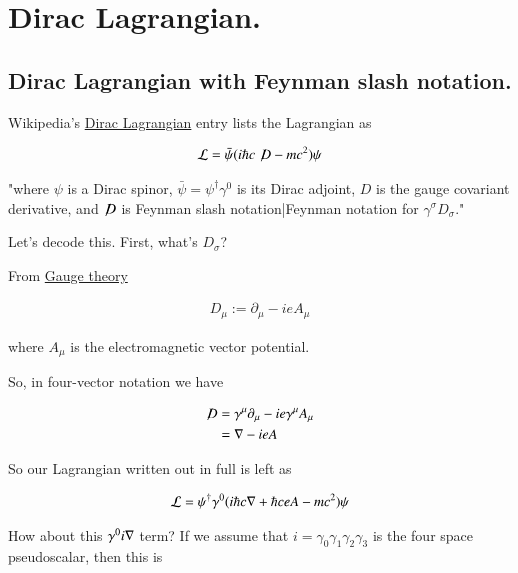 \chapter{Dirac Lagrangian.}
\label{chap:diracLagrangian}
\date{ Dec 21, 2008.  $RCSfile: diracLagrangian.tex,v $ Last $Revision: 1.15 $ $Date: 2009/10/22 02:07:20 $ }

\section{Dirac Lagrangian with Feynman slash notation. }

Wikipedia's \href{http://en.wikipedia.org/wiki/Lagrangian#Dirac_Lagrangian}{Dirac Lagrangian} entry lists the Lagrangian as

\begin{align*}
\mathcal{L} = \bar \psi (i \hbar c \not\!D - mc^2) \psi
\end{align*}

"where $\psi\!$ is a Dirac spinor, $\bar \psi = \psi^\dagger \gamma^0$ is its Dirac adjoint, $D\!$ is the gauge covariant derivative, and $\not\!D$ is Feynman slash notation|Feynman notation for $\gamma^\sigma D_\sigma\!$."

Let's decode this.  First, what's $D_\sigma$?

From \href{http://en.wikipedia.org/wiki/Gauge_covariant_derivative}{Gauge theory}

\begin{align*}
D_\mu := \partial_\mu - i e A_\mu
\end{align*}

where $A_\mu$ is the electromagnetic vector potential.

So, in four-vector notation we have

\begin{align*}
\not\!D 
&= \gamma^\mu \partial_\mu - i e \gamma^\mu A_\mu \\
&= \nabla - i e A \\
\end{align*}

So our Lagrangian written out in full is left as

\begin{align}\label{eqn:diracLag:lag1}
\mathcal{L} = \psi^\dagger \gamma^0 ( i \hbar c \nabla + \hbar c e A - mc^2) \psi
\end{align}

How about this $\gamma^0 i \nabla$ term?  If we assume that $i = \gamma_0 \gamma_1 \gamma_2 \gamma_3$ is the four space pseudoscalar, then this is

